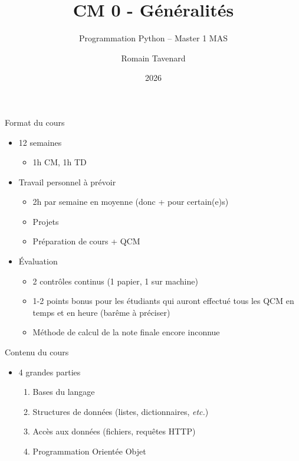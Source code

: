 \documentclass[10pt]{beamer}
\title[M1 MAS -- Python -- Généralités]{CM 0 - Généralités}
\subtitle{Programmation Python -- Master 1 MAS}
\author{Romain Tavenard}
\date{2026}
\institute{%
\hypersetup{urlcolor=.}
\makebox[2.2ex][c]{\faEnvelope}\enspace\href{mailto:romain.tavenard@univ-rennes2.fr}{\texttt{romain.tavenard@univ-rennes2.fr}}\\%
}
\begin{document}
\maketitle

\begin{frame}{Format du cours}  
  \begin{itemize}
    \item 12 semaines
    \begin{itemize}
      \item 1h CM, 1h TD
    \end{itemize}
    \item Travail personnel à prévoir
    \begin{itemize}
      \item 2h par semaine en moyenne (donc + pour certain(e)s)
      \item Projets
      \item Préparation de cours + QCM
    \end{itemize}
    \item Évaluation
    \begin{itemize}
      \item 2 contrôles continus (1 papier, 1 sur machine)
      \item 1-2 points bonus pour les étudiants qui auront effectué tous les QCM en temps et en heure (barême à préciser)
      \item Méthode de calcul de la note finale encore inconnue
    \end{itemize}
  \end{itemize}
\end{frame}

\begin{frame}{Contenu du cours}  
  \begin{itemize}
    \item 4 grandes parties
    \begin{enumerate}
      \item Bases du langage
      \item Structures de données (listes, dictionnaires, \emph{etc.})
      \item Accès aux données (fichiers, requêtes HTTP)
      \item Programmation Orientée Objet
    \end{enumerate}
  \end{itemize}
\end{frame}
\end{document}
